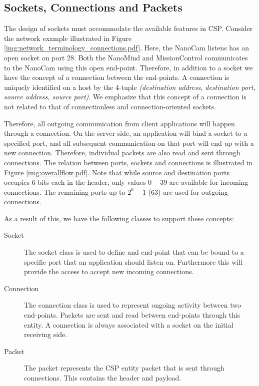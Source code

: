 \subsection{Sockets, Connections and Packets}
The design of sockets must accommodate the available features in CSP. Consider the network example illustrated in Figure \ref{img:network_terminology_connections.pdf}. Here, the NanoCam listens has an open socket on port 28. Both the NanoMind and MissionControl communicates to the NanoCam using this open end-point. Therefore, in addition to a socket we have the concept of a connection between the end-points. A connection is uniquely identified on a host by the 4-tuple \textit{(destination address, destination port, source address, source port)}. We emphasize that this concept of a connection is not related to that of connectionless and connection-oriented sockets.

Therefore, all outgoing communication from client applications will happen through a connection. On the server side, an application will bind a socket to a specified port, and all subsequent communication on that port will end up with a new connection. Therefore, individual packets are also read and sent through connections. The relation between ports, sockets and connections is illustrated in Figure \ref{img:overallflow.pdf}. Note that while source and destination ports occupies 6 bits each in the header, only values $0-39$ are available for incoming connections. The remaining ports up to $2^6-1$ (63) are used for outgoing connections.

As a result of this, we have the following classes to support these concepts:
\begin{description}
	\item[Socket] The socket class is used to define and end-point that can be bound to a specific port that an application should listen on. Furthermore this will provide the access to accept new incoming connections.
	\item[Connection] The connection class is used to represent ongoing activity between two end-points. Packets are sent and read between end-points through this entity. A connection is always associated with a socket on the initial receiving side.
	\item[Packet] The packet represents the CSP entity packet that is sent through connections. This contains the header and payload.
\end{description}
